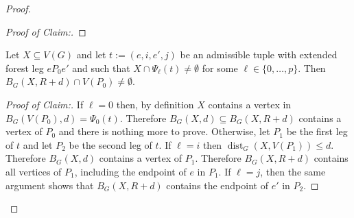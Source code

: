 \documentclass{patmorin}
\newcommand{\pat}[1]{\textcolor{Blue}{Pat: #1}}
\newenvironment{clmproof}{\begin{proof}[Proof of Claim:]\renewcommand{\qedsymbol}{\rule{1ex}{1ex}}}{\end{proof}}
\DeclareMathOperator{\dist}{dist}
\begin{document}
\begin{proof}
\begin{clmproof}
\end{clmproof}


\begin{clm}
  Let $X\subseteq V(G)$ and let $t:=(e,i,e',j)$ be an admissible tuple with extended forest leg $eP_0e'$ and such that $X\cap \Psi_\ell(t)\neq\emptyset$ for some $\ell\in\{0,\ldots,p\}$.  Then $B_G(X,R+d)\cap V(P_0)\neq\emptyset$.
\end{clm}

\begin{clmproof}
  If $\ell=0$ then, by definition $X$ contains a vertex in $B_G(V(P_0),d)=\Psi_0(t)$.  Therefore $B_G(X,d)\subseteq B_G(X,R+d)$ contains a vertex of $P_0$ and there is nothing more to prove.
  Otherwise, let $P_1$ be the first leg of $t$ and let $P_2$ be the second leg of $t$.
  If $\ell=i$ then $\dist_G(X,V(P_1))\le d$.  Therefore $B_G(X,d)$ contains a vertex of $P_1$.  Therefore $B_G(X,R+d)$ contains all vertices of $P_1$, including the endpoint of $e$ in $P_1$.  If $\ell=j$, then the same argument shows that $B_G(X,R+d)$ contains the endpoint of $e'$ in $P_2$.
\end{clmproof}


\end{proof}
\end{document}
